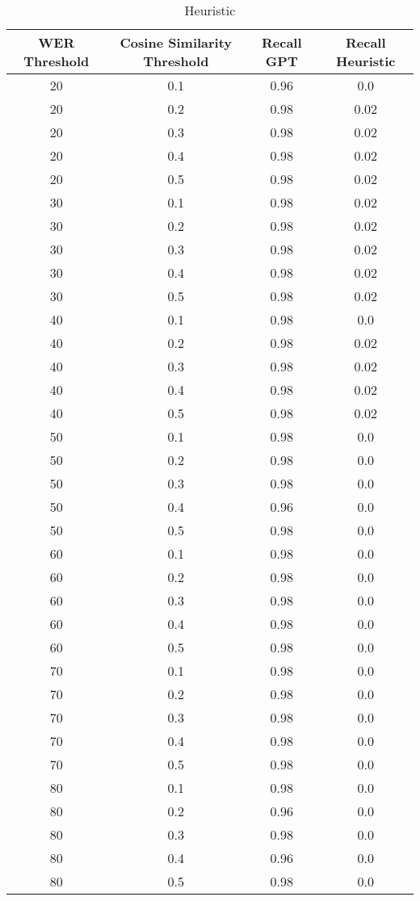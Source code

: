 \begin{table}[ht]
\centering
\tiny
\caption{Comparison of Recall Scores for GPT and Heuristic Methods}
\label{tab:recall_comparison}
\begin{tabular}{cccc}
\toprule
\textbf{WER Threshold} & \textbf{Cosine Similarity Threshold} & \textbf{Recall GPT} & \textbf{Recall Heuristic} \\
\midrule
20 & 0.1 & 0.96 & 0.0 \\
20 & 0.2 & 0.98 & 0.02 \\
20 & 0.3 & 0.98 & 0.02 \\
20 & 0.4 & 0.98 & 0.02 \\
20 & 0.5 & 0.98 & 0.02 \\
30 & 0.1 & 0.98 & 0.02 \\
30 & 0.2 & 0.98 & 0.02 \\
30 & 0.3 & 0.98 & 0.02 \\
30 & 0.4 & 0.98 & 0.02 \\
30 & 0.5 & 0.98 & 0.02 \\
40 & 0.1 & 0.98 & 0.0 \\
40 & 0.2 & 0.98 & 0.02 \\
40 & 0.3 & 0.98 & 0.02 \\
40 & 0.4 & 0.98 & 0.02 \\
40 & 0.5 & 0.98 & 0.02 \\
50 & 0.1 & 0.98 & 0.0 \\
50 & 0.2 & 0.98 & 0.0 \\
50 & 0.3 & 0.98 & 0.0 \\
50 & 0.4 & 0.96 & 0.0 \\
50 & 0.5 & 0.98 & 0.0 \\
60 & 0.1 & 0.98 & 0.0 \\
60 & 0.2 & 0.98 & 0.0 \\
60 & 0.3 & 0.98 & 0.0 \\
60 & 0.4 & 0.98 & 0.0 \\
60 & 0.5 & 0.98 & 0.0 \\
70 & 0.1 & 0.98 & 0.0 \\
70 & 0.2 & 0.98 & 0.0 \\
70 & 0.3 & 0.98 & 0.0 \\
70 & 0.4 & 0.98 & 0.0 \\
70 & 0.5 & 0.98 & 0.0 \\
80 & 0.1 & 0.98 & 0.0 \\
80 & 0.2 & 0.96 & 0.0 \\
80 & 0.3 & 0.98 & 0.0 \\
80 & 0.4 & 0.96 & 0.0 \\
80 & 0.5 & 0.98 & 0.0 \\
\bottomrule
\end{tabular}
\caption{Heuristic}
\label{Heuristic}
\end{table}
